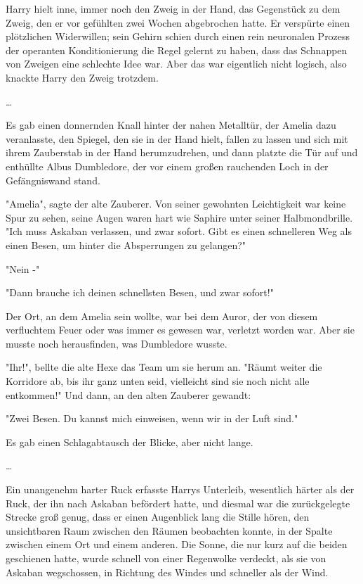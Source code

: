 {Harry hielt inne, immer noch den Zweig in der Hand, das Gegenstück zu dem Zweig, den er vor gefühlten zwei Wochen abgebrochen hatte. Er verspürte einen plötzlichen Widerwillen; sein Gehirn schien durch einen rein neuronalen Prozess der operanten Konditionierung die Regel gelernt zu haben, dass das Schnappen von Zweigen eine schlechte Idee war. Aber das war eigentlich nicht logisch, also knackte Harry den Zweig trotzdem.

…

Es gab einen donnernden Knall hinter der nahen Metalltür, der Amelia dazu veranlasste, den Spiegel, den sie in der Hand hielt, fallen zu lassen und sich mit ihrem Zauberstab in der Hand herumzudrehen, und dann platzte die Tür auf und enthüllte Albus Dumbledore, der vor einem großen rauchenden Loch in der Gefängniswand stand.

"Amelia", sagte der alte Zauberer. Von seiner gewohnten Leichtigkeit war keine Spur zu sehen, seine Augen waren hart wie Saphire unter seiner Halbmondbrille. "Ich muss Askaban verlassen, und zwar sofort. Gibt es einen schnelleren Weg als einen Besen, um hinter die Absperrungen zu gelangen?"

"Nein -"

"Dann brauche ich deinen schnellsten Besen, und zwar sofort!"

Der Ort, an dem Amelia sein wollte, war bei dem Auror, der von diesem verfluchtem Feuer oder was immer es gewesen war, verletzt worden war. Aber sie musste noch herausfinden, was Dumbledore wusste.

"Ihr!", bellte die alte Hexe das Team um sie herum an. "Räumt weiter die Korridore ab, bis ihr ganz unten seid, vielleicht sind sie noch nicht alle entkommen!" Und dann, an den alten Zauberer gewandt:

"Zwei Besen. Du kannst mich einweisen, wenn wir in der Luft sind."

Es gab einen Schlagabtausch der Blicke, aber nicht lange.

…

Ein unangenehm harter Ruck erfasste Harrys Unterleib, wesentlich härter als der Ruck, der ihn nach Askaban befördert hatte, und diesmal war die zurückgelegte Strecke groß genug, dass er einen Augenblick lang die Stille hören, den unsichtbaren Raum zwischen den Räumen beobachten konnte, in der Spalte zwischen einem Ort und einem anderen. Die Sonne, die nur kurz auf die beiden geschienen hatte, wurde schnell von einer Regenwolke verdeckt, als sie von Askaban wegschossen, in Richtung des Windes und schneller als der Wind.

}
